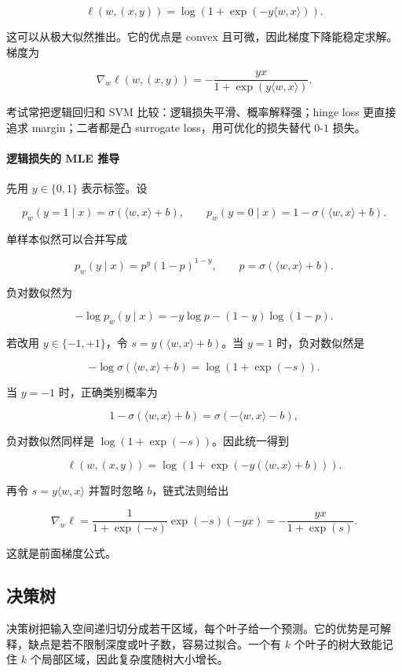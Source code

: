 \documentclass[11pt]{ctexart}
\begin{document}
\[
  \ell(w,(x,y))
  =
  \log\left(1+\exp(-y\langle w,x\rangle)\right).
\]

这可以从极大似然推出。它的优点是 convex 且可微，因此梯度下降能稳定求解。梯度为

\[
  \nabla_w\ell(w,(x,y))
  =
  -\frac{y x}{1+\exp(y\langle w,x\rangle)}.
\]

考试常把逻辑回归和 SVM 比较：逻辑损失平滑、概率解释强；hinge loss 更直接追求 margin；二者都是凸 surrogate loss，用可优化的损失替代 \(0\)-\(1\) 损失。

\paragraph{逻辑损失的 MLE 推导}

先用 \(y\in\{0,1\}\) 表示标签。设

\[
  p_w(y=1\mid x)=\sigma(\langle w,x\rangle+b),
  \qquad
  p_w(y=0\mid x)=1-\sigma(\langle w,x\rangle+b).
\]

单样本似然可以合并写成

\[
  p_w(y\mid x)
  =
  p^y(1-p)^{1-y},
  \qquad
  p=\sigma(\langle w,x\rangle+b).
\]

负对数似然为

\[
  -\log p_w(y\mid x)
  =
  -y\log p-(1-y)\log(1-p).
\]

若改用 \(y\in\{-1,+1\}\)，令 \(s=y(\langle w,x\rangle+b)\)。当 \(y=1\) 时，负对数似然是

\[
  -\log\sigma(\langle w,x\rangle+b)
  =
  \log(1+\exp(-s)).
\]

当 \(y=-1\) 时，正确类别概率为

\[
  1-\sigma(\langle w,x\rangle+b)
  =
  \sigma(-\langle w,x\rangle-b),
\]

负对数似然同样是 \(\log(1+\exp(-s))\)。因此统一得到

\[
  \ell(w,(x,y))
  =
  \log(1+\exp(-y(\langle w,x\rangle+b))).
\]

再令 \(s=y\langle w,x\rangle\) 并暂时忽略 \(b\)，链式法则给出

\[
  \nabla_w \ell
  =
  \frac{1}{1+\exp(-s)}
  \exp(-s)(-y x)
  =
  -\frac{y x}{1+\exp(s)}.
\]

这就是前面梯度公式。

\subsection{决策树}

决策树把输入空间递归切分成若干区域，每个叶子给一个预测。它的优势是可解释，缺点是若不限制深度或叶子数，容易过拟合。一个有 \(k\) 个叶子的树大致能记住 \(k\) 个局部区域，因此复杂度随树大小增长。
\end{document}
